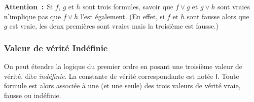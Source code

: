 \noindent \textbf{Attention :} Si $f$, $g$ et $h$ sont trois formules, savoir que $f \vee g$ et $g \vee h$ sont vraies n'implique pas que $f \vee h$ l'est également. 
(En effet, si $f$ et $h$ sont fausse alors que $g$ est vraie, les deux premières sont vraies mais la troisième est fausse.)

\subsubsection{Valeur de vérité Indéfinie}
\label{subsub:Indéfinie}

On peut étendre la logique du premier ordre en posant une troisième valeur de vérité, dite \textit{indéfinie}. 
La constante de vérité correspondante est notée $\mathsf{I}$. 
Toute formule est alors associée à une (et une seule) des trois valeurs de vérité vraie, fausse ou indéfinie. 


